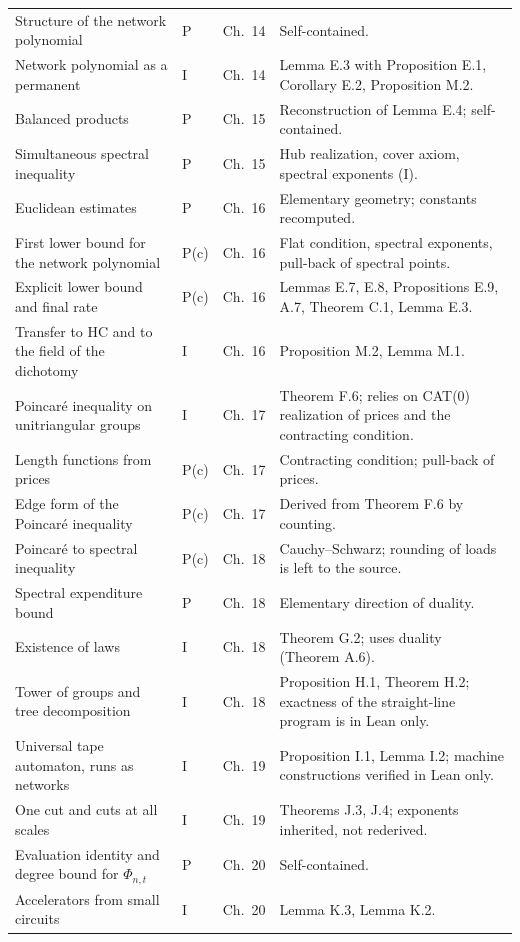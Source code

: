 \documentclass[11pt,letterpaper]{report}
\theoremstyle{plain}
\theoremstyle{definition}
\theoremstyle{remark}
\begin{document}
{\begin{longtable}{p{}p{}p{}p{}}
Structure of the network polynomial & P & Ch.\ 14 & Self-contained.\\
Network polynomial as a permanent & I & Ch.\ 14 & Lemma E.3 with Proposition E.1, Corollary E.2, Proposition M.2.\\
Balanced products & P & Ch.\ 15 & Reconstruction of Lemma E.4; self-contained.\\
Simultaneous spectral inequality & P & Ch.\ 15 & Hub realization, cover axiom, spectral exponents (I).\\
Euclidean estimates & P & Ch.\ 16 & Elementary geometry; constants recomputed.\\
First lower bound for the network polynomial & P(c) & Ch.\ 16 & Flat condition, spectral exponents, pull-back of spectral points.\\
Explicit lower bound and final rate & P(c) & Ch.\ 16 & Lemmas E.7, E.8, Propositions E.9, A.7, Theorem C.1, Lemma E.3.\\
Transfer to HC and to the field of the dichotomy & I & Ch.\ 16 & Proposition M.2, Lemma M.1.\\
Poincar\'e inequality on unitriangular groups & I & Ch.\ 17 & Theorem F.6; relies on CAT(0) realization of prices and the contracting condition.\\
Length functions from prices & P(c) & Ch.\ 17 & Contracting condition; pull-back of prices.\\
Edge form of the Poincar\'e inequality & P(c) & Ch.\ 17 & Derived from Theorem F.6 by counting.\\
Poincar\'e to spectral inequality & P(c) & Ch.\ 18 & Cauchy--Schwarz; rounding of loads is left to the source.\\
Spectral expenditure bound & P & Ch.\ 18 & Elementary direction of duality.\\
Existence of laws & I & Ch.\ 18 & Theorem G.2; uses duality (Theorem A.6).\\
Tower of groups and tree decomposition & I & Ch.\ 18 & Proposition H.1, Theorem H.2; exactness of the straight-line program is in Lean only.\\
Universal tape automaton, runs as networks & I & Ch.\ 19 & Proposition I.1, Lemma I.2; machine constructions verified in Lean only.\\
One cut and cuts at all scales & I & Ch.\ 19 & Theorems J.3, J.4; exponents inherited, not rederived.\\
Evaluation identity and degree bound for $\Phi_{n,t}$ & P & Ch.\ 20 & Self-contained.\\
Accelerators from small circuits & I & Ch.\ 20 & Lemma K.3, Lemma K.2.\\

\end{longtable}}
\end{document}
